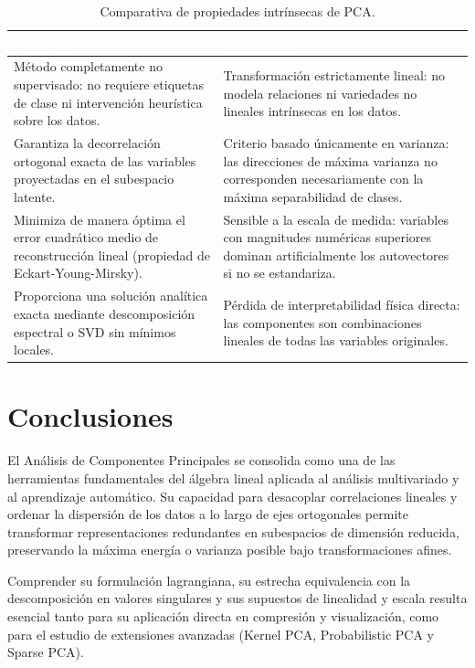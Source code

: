 \documentclass[11pt,letterpaper]{article}
\begin{document}
	\begin{table}[h!]
		\centering
		\caption{Comparativa de propiedades intrínsecas de PCA.}
		\label{tab:ventajas}
		\begin{tabular}{@{}p{6.6cm}p{6.6cm}@{}}
			\toprule
			\rowcolor{accent!85}
			\textcolor{white}{\textbf{Ventajas}} & \textcolor{white}{\textbf{Limitaciones}} \\
			\midrule
			Método completamente no supervisado: no requiere etiquetas de clase ni intervención heurística sobre los datos. & Transformación estrictamente lineal: no modela relaciones ni variedades no lineales intrínsecas en los datos. \\
			\addlinespace
			Garantiza la decorrelación ortogonal exacta de las variables proyectadas en el subespacio latente. & Criterio basado únicamente en varianza: las direcciones de máxima varianza no corresponden necesariamente con la máxima separabilidad de clases. \\
			\addlinespace
			Minimiza de manera óptima el error cuadrático medio de reconstrucción lineal (propiedad de Eckart-Young-Mirsky). & Sensible a la escala de medida: variables con magnitudes numéricas superiores dominan artificialmente los autovectores si no se estandariza. \\
			\addlinespace
			Proporciona una solución analítica exacta mediante descomposición espectral o SVD sin mínimos locales. & Pérdida de interpretabilidad física directa: las componentes son combinaciones lineales de todas las variables originales. \\
			\bottomrule
		\end{tabular}
	\end{table}
	\newpage
	\section{Conclusiones}
	
	El Análisis de Componentes Principales se consolida como una de las herramientas fundamentales del álgebra lineal aplicada al análisis multivariado y al aprendizaje automático. Su capacidad para desacoplar correlaciones lineales y ordenar la dispersión de los datos a lo largo de ejes ortogonales permite transformar representaciones redundantes en subespacios de dimensión reducida, preservando la máxima energía o varianza posible bajo transformaciones afines.
	
	Comprender su formulación lagrangiana, su estrecha equivalencia con la descomposición en valores singulares y sus supuestos de linealidad y escala resulta esencial tanto para su aplicación directa en compresión y visualización, como para el estudio de extensiones avanzadas (Kernel PCA, Probabilistic PCA y Sparse PCA).
	
\end{document}
